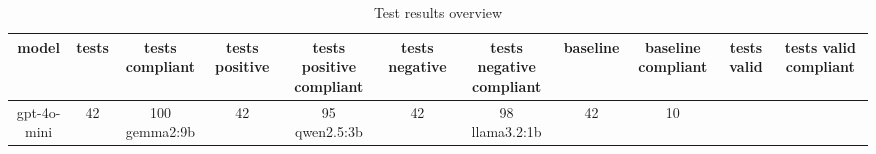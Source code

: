 
  \begin{table}[h!]
  \centering
  \begin{tabular}{|c|c|c|c|c|c|c|c|c|c|c|}
  \hline
  model & tests & tests compliant & tests positive & tests positive compliant & tests negative & tests negative compliant & baseline & baseline compliant & tests valid & tests valid compliant \\
  \hline
  gpt-4o-mini & 42 & 100%
\hline
gemma2:9b & 42 & 95%
\hline
qwen2.5:3b & 42 & 98%
\hline
llama3.2:1b & 42 & 10%
  \end{tabular}
  \caption{Test results overview}
  
  \end{table}
  